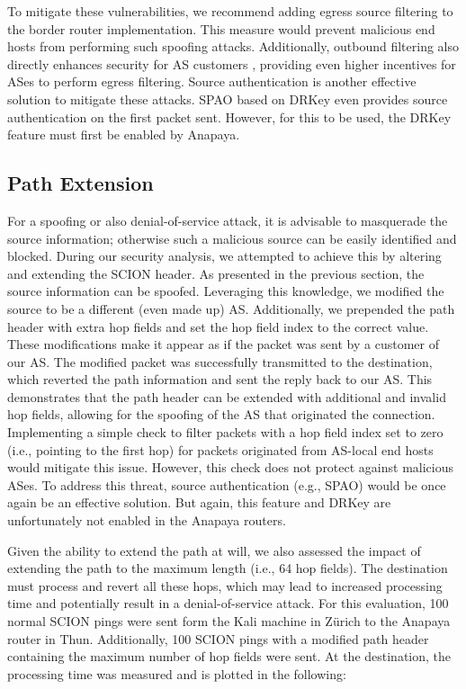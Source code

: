 To mitigate these vulnerabilities, we recommend adding egress source filtering to the border router implementation.
This measure would prevent malicious end hosts from performing such spoofing attacks.
Additionally, outbound filtering also directly enhances security for AS customers \cite[Section 7.7.3]{Perrig2022}, providing even higher incentives for ASes to perform egress filtering.
Source authentication is another effective solution to mitigate these attacks.
SPAO based on DRKey even provides source authentication on the first packet sent.
However, for this to be used, the DRKey feature must first be enabled by Anapaya.




\subsection{Path Extension}
\label{sec:path-extension}
For a spoofing or also denial-of-service attack, it is advisable to masquerade the source information; otherwise such a malicious source can be easily identified and blocked.
During our security analysis, we attempted to achieve this by altering and extending the SCION header.
As presented in the previous section, the source information can be spoofed.
Leveraging this knowledge, we modified the source to be a different (even made up) AS.
Additionally, we prepended the path header with extra hop fields and set the hop field index to the correct value.
These modifications make it appear as if the packet was sent by a customer of our AS.
The modified packet was successfully transmitted to the destination, which reverted the path information and sent the reply back to our AS.
This demonstrates that the path header can be extended with additional and invalid hop fields, allowing for the spoofing of the AS that originated the connection.
Implementing a simple check to filter packets with a hop field index set to zero (i.e., pointing to the first hop) for packets originated from AS-local end hosts would mitigate this issue.
However, this check does not protect against malicious ASes.
To address this threat, source authentication (e.g., SPAO) would be once again be an effective solution.
But again, this feature and DRKey are unfortunately not enabled in the Anapaya routers.

Given the ability to extend the path at will, we also assessed the impact of extending the path to the maximum length (i.e., 64 hop fields).
The destination must process and revert all these hops, which may lead to increased processing time and potentially result in a denial-of-service attack.
For this evaluation, 100 normal SCION pings were sent form the Kali machine in Zürich to the Anapaya router in Thun.
Additionally, 100 SCION pings with a modified path header containing the maximum number of hop fields were sent.
At the destination, the processing time was measured and is plotted in the following:

